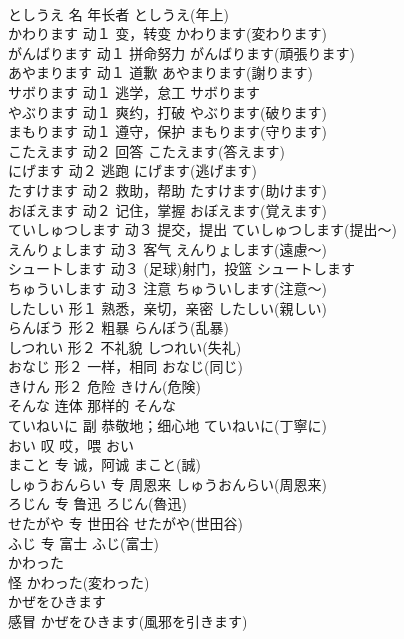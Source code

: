 \documentclass[8pt]{extreport}
\begin{document}
\begin{CJK}{UTF8}{min}
\\	としうえ	名	年长者	としうえ(年上)	
\\	かわります	动１	变，转变	かわります(変わります)	
\\	がんばります	动１	拼命努力	がんばります(頑張ります)	
\\	あやまります	动１	道歉	あやまります(謝ります)	
\\	サボります	动１	逃学，怠工	サボります	
\\	やぶります	动１	爽约，打破	やぶります(破ります)	
\\	まもります	动１	遵守，保护	まもります(守ります)	
\\	こたえます	动２	回答	こたえます(答えます)	
\\	にげます	动２	逃跑	にげます(逃げます)	
\\	たすけます	动２	救助，帮助	たすけます(助けます)	
\\	おぼえます	动２	记住，掌握	おぼえます(覚えます)	
\\	ていしゅつします	动３	提交，提出	ていしゅつします(提出～)	
\\	えんりょします	动３	客气	えんりょします(遠慮～)	
\\	シュートします	动３	(足球)射门，投篮	シュートします	
\\	ちゅういします	动３	注意	ちゅういします(注意～)	
\\	したしい	形１	熟悉，亲切，亲密	したしい(親しい)	
\\	らんぼう	形２	粗暴	らんぼう(乱暴)	
\\	しつれい	形２	不礼貌	しつれい(失礼)	
\\	おなじ	形２	一样，相同	おなじ(同じ)	
\\	きけん	形２	危险	きけん(危険)	
\\	そんな	连体	那样的	そんな	
\\	ていねいに	副	恭敬地；细心地	ていねいに(丁寧に)	
\\	おい	叹	哎，喂	おい	
\\	まこと	专	诚，阿诚	まこと(誠)	
\\	しゅうおんらい	专	周恩来	しゅうおんらい(周恩来)	
\\	ろじん	专	鲁迅	ろじん(魯迅)	
\\	せたがや	专	世田谷	せたがや(世田谷)	
\\	ふじ	专	富士	ふじ(富士)	
\\	かわった	
\\	怪	かわった(変わった)	
\\	かぜをひきます	
\\	感冒	かぜをひきます(風邪を引きます)	

\end{CJK}
\end{document}
